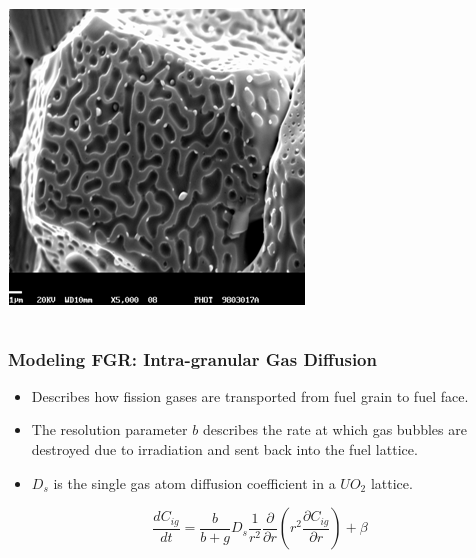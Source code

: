 \begin{frame}
\begin{columns}
\begin{column}{0.5\textwidth}
  \includegraphics[width=1.\textwidth]{./fgr_4.png}
 \end{column}
\end{columns}


\end{frame}
\begin{frame}
\frametitle{Modeling FGR: Intra-granular Gas Diffusion}

\begin{itemize}
  \item Describes how fission gases are transported from fuel grain to fuel face. 
  \item The resolution parameter $b$ describes the rate at which gas bubbles are destroyed due to irradiation and sent back into the fuel lattice.
  \item $D_s$ is the single gas atom diffusion coefficient in a $UO_2$ lattice.
\end{itemize}

\begin{equation}
 \frac{dC_{ig}}{dt} = \frac{b}{b+g}D_s \frac{1}{r^2} \frac{\partial}{\partial r} \left(r^2 \frac{\partial C_{ig}}{\partial r} \right) +\beta \nonumber
\end{equation}

\end{frame}
